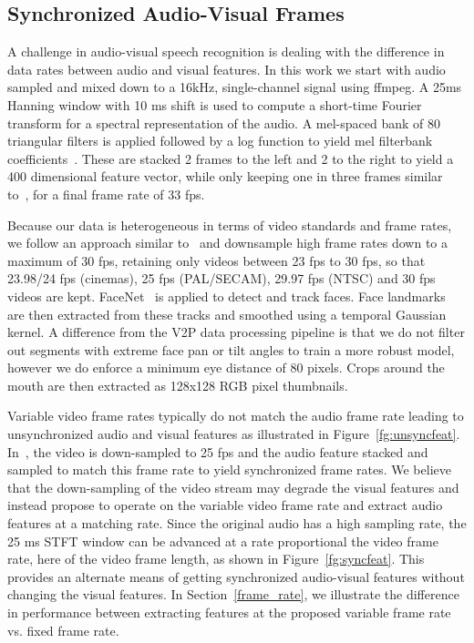 \documentclass{article}
\newcommand{\negsectionspace}{\vspace{-4pt}}
\begin{document}
\subsection{Synchronized Audio-Visual Frames}
\label{sec:syncav}
\negsectionspace
A challenge in audio-visual speech recognition is dealing with the
difference in data rates between audio and visual features. In this
work we start with audio sampled and mixed down to a 16kHz,
single-channel signal using ffmpeg. A 25ms Hanning window with 10 ms
shift is used to compute a short-time Fourier transform for a spectral
representation of the audio. A mel-spaced bank of 80 triangular
filters is applied followed by a log function to yield mel filterbank
coefficients~\citet{Davis80}. These are stacked 2 frames to the left
and 2 to the right to yield a 400 dimensional feature vector, while
only keeping one in three frames similar to~\citet{ctcph15senior}, for
a final frame rate of 33 fps.

Because our data is heterogeneous in terms of video standards and frame
rates, we follow an approach similar to~\citet{dm_lsvsr_2018} and
downsample high frame rates down to a maximum of 30 fps, retaining
only videos between 23 fps to 30 fps, so that 23.98/24 fps (cinemas),
25 fps (PAL/SECAM), 29.97 fps (NTSC) and 30 fps videos are kept.
FaceNet~\citet{facenet15schroff} is applied to detect and track
faces. Face landmarks are then extracted from these tracks and
smoothed using a temporal Gaussian kernel. A difference from the V2P
data processing pipeline is that we do not filter out segments with
extreme face pan or tilt angles to train a more robust model, however
we do enforce a minimum eye distance of 80 pixels. Crops around the
mouth are then extracted as 128x128 RGB pixel thumbnails.

Variable video frame rates typically do not match the audio
frame rate leading to unsynchronized audio and visual features as
illustrated in Figure~\ref{fg:unsyncfeat}. In~\citet{ox_davsr_2018},
the video is down-sampled to 25 fps and the audio feature stacked and
sampled to match this frame rate to yield synchronized frame rates. We
believe that the down-sampling of the video stream may degrade the
visual features and instead propose to operate on the
variable video frame rate and extract audio features at a matching
rate. Since the original audio has a high sampling rate, the 25 ms
STFT window can be advanced at a rate proportional the video frame
rate, here  of the video frame length, as shown in
Figure~\ref{fg:syncfeat}. This provides an alternate means of getting
synchronized audio-visual features without changing the visual features.
In Section~\ref{frame_rate}, we illustrate the difference in performance
between extracting features at the proposed variable frame rate
vs. fixed frame rate.
\end{document}
